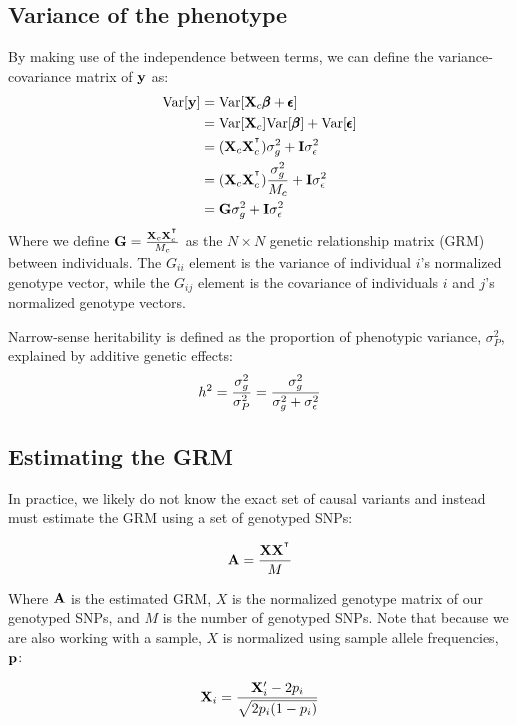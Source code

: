 \documentclass[12pt]{article}
\begin{document}
\subsection{Variance of the phenotype}
By making use of the independence between terms, we can define the variance-covariance matrix of $\mathbf{y}$ as:
\begin{align*}
    \mathrm{Var}[\mathbf{y}] &= \mathrm{Var}[\mathbf{X}_c \pmb{\beta} + \pmb{\epsilon}] \\
    &= \mathrm{Var}[\mathbf{X}_c] \mathrm{Var}[\pmb{\beta}] + \mathrm{Var}[\pmb{\epsilon}] \\
    &= (\mathbf{X}_c \mathbf{X}_c^{^\intercal}) \sigma_g^2 + \mathbf{I} \sigma_{\epsilon}^2 \\
    &= (\mathbf{X}_c \mathbf{X}_c^{^\intercal}) \frac{\sigma_g^2}{M_c} + \mathbf{I} \sigma_{\epsilon}^2 \\
    &= \mathbf{G} \sigma_g^2 + \mathbf{I} \sigma_{\epsilon}^2 \\
\end{align*}
Where we define $\mathbf{G} = \frac{\mathbf{X}_c \mathbf{X}_c^{^\intercal}}{M_c}$ as the $N \times N$ genetic relationship matrix (GRM) between individuals.
The $G_{ii}$ element is the variance of individual $i$'s normalized genotype vector, while the $G_{ij}$ element is the covariance of individuals $i$ and $j$'s normalized genotype vectors.

Narrow-sense heritability is defined as the proportion of phenotypic variance, $\sigma_P^2$, explained by additive genetic effects:
$$ h^2 = \frac{\sigma_g^2}{\sigma_P^2} = \frac{\sigma_g^2}{\sigma_g^2 + \sigma_{\epsilon}^2} $$

\subsection{Estimating the GRM}

In practice, we likely do not know the exact set of causal variants and instead must estimate the GRM using a set of genotyped SNPs:

$$ \mathbf{A} = \frac{\mathbf{X} \mathbf{X}^{^\intercal}}{M} $$

Where $\mathbf{A}$ is the estimated GRM, $X$ is the normalized genotype matrix of our genotyped SNPs, and $M$ is the number of genotyped SNPs.
Note that because we are also working with a sample, $X$ is normalized using sample allele frequencies, $\mathbf{p}$:

$$ \mathbf{X}_i = \frac{\mathbf{X}'_i - 2 p_i}{\sqrt{2 p_i (1 - p_i)}} $$
\end{document}
